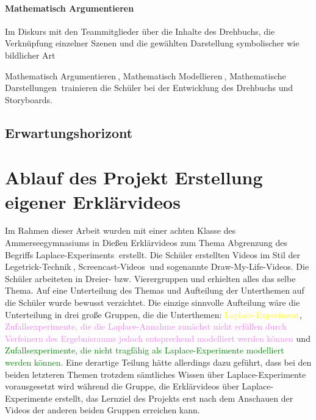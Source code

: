 \documentclass[a4paper,12pt,twoside=false]{scrartcl}
\begin{document}
\paragraph{Mathematisch Argumentieren}
Im Diskurs mit den Teammitglieder über die Inhalte des Drehbuchs, die Verknüpfung einzelner Szenen und die gewählten Darstellung symbolischer wie bildlicher Art 


\glqq Mathematisch Argumentieren\grqq$~$, \glqq Mathematisch Modellieren\grqq$~$, \glqq Mathematische Darstellungen\grqq$~$ trainieren die Schüler bei der Entwicklung des Drehbuchs und Storyboards.


\subsection{Erwartungshorizont}
\section{Ablauf des Projekt Erstellung eigener Erklärvideos}
Im Rahmen dieser Arbeit wurden mit einer achten Klasse des Ammerseegymnasiums in Dießen Erklärvideos zum Thema \glqq Abgrenzung des Begriffs Laplace-Experiments\grqq$~$ erstellt. Die Schüler erstellten Videos im Stil der \glqq Legetrick-Technik\grqq $~$, \glqq Screencast-Videos\grqq$~$ und sogenannte \glqq Draw-My-Life-Videos\grqq. Die Schüler arbeiteten in Dreier- bzw. Vierergruppen und erhielten alles das selbe Thema. Auf eine Unterteilung des Themas und Aufteilung der Unterthemen auf die Schüler wurde bewusst verzichtet. Die einzige sinnvolle Aufteilung wäre die Unterteilung in drei große Gruppen, die die Unterthemen: \textcolor{yellow}{Laplace-Experiment}, \textcolor{violet}{Zufallsexperimente, die die Laplace-Annahme zunächst nicht erfüllen durch Verfeinern des Ergebnisraums jedoch entsprechend modelliert werden können} und \textcolor{green}{Zufallsexperimente, die nicht tragfähig als Laplace-Experimente modelliert werden können}. Eine derartige Teilung hätte allerdings dazu geführt, dass bei den beiden letzteren Themen trotzdem sämtliches Wissen über Laplace-Experimente vorausgesetzt wird während die Gruppe, die Erklärvideos über Laplace-Experimente erstellt, das Lernziel des Projekts erst nach dem Anschauen der Videos der anderen beiden Gruppen erreichen kann. 


  
\end{document}
